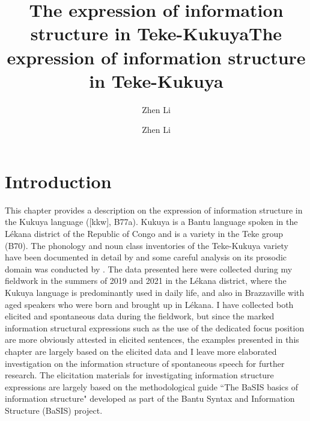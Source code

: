 \documentclass[output=paper,colorlinks,citecolor=brown,
]{langscibook}
\author{Zhen Li\affiliation{Peking University}}
\title{The expression of information structure in Teke-Kukuya}
\title{The expression of information structure in Teke-Kukuya}
\author{Zhen Li\affiliation{Peking University}}
\begin{document}
\maketitle
\label{ch:3}

\section{Introduction}\label{teke:sec:1}
This chapter provides a description on the expression of information structure in the Kukuya language ([kkw], B77a). Kukuya is a Bantu language spoken in the Lékana district of the Republic of Congo and is a variety in the Teke group (B70). The phonology and noun class inventories of the Teke-Kukuya variety have been documented in detail by \citet{Paulian1975} and some careful analysis on its prosodic domain was conducted by \citet{Hyman1987}. The data presented here were collected during my fieldwork in the summers of 2019 and 2021 in the Lékana district, where the Kukuya language is predominantly used in daily life, and also in Brazzaville with aged speakers who were born and brought up in Lékana. I have collected both elicited and spontaneous data during the fieldwork, but since the marked information structural expressions such as the use of the dedicated focus position are more obviously attested in elicited sentences, the examples presented in this chapter are largely based on the elicited data and I leave more elaborated investigation on the information structure of spontaneous speech for further research. The elicitation materials for investigating information structure expressions are largely based on the methodological guide ``The BaSIS basics of information structure" \citep{vanderWal2021a} developed as part of the Bantu Syntax and Information Structure (BaSIS) project.
\end{document}
